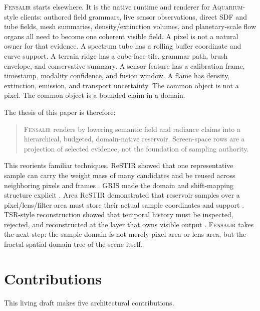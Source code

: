 \documentclass[11pt]{article}
\newcommand{\Fensalir}{\textsc{Fensalir}}
\newcommand{\Aquarium}{\textsc{Aquarium}}
\newcommand{\ReSTIR}{ReSTIR}
\newcommand{\AreaReSTIR}{Area ReSTIR}
\newcommand{\TSR}{TSR}
\newcommand{\GRIS}{GRIS}
\begin{document}
\Fensalir{} starts elsewhere.  It is the native runtime and renderer for
\Aquarium-style clients: authored field grammars, live sensor observations,
direct SDF and tube fields, mesh summaries, density/extinction volumes, and
planetary-scale flow organs all need to become one coherent visible field.  A
pixel is not a natural owner for that evidence.  A spectrum tube has a rolling
buffer coordinate and curve support.  A terrain ridge has a cube-face tile,
grammar path, brush envelope, and conservative summary.  A sensor feature has a
calibration frame, timestamp, modality confidence, and fusion window.  A flame
has density, extinction, emission, and transport uncertainty.  The common
object is not a pixel.  The common object is a bounded claim in a domain.

The thesis of this paper is therefore:

\begin{quote}
\Fensalir{} renders by lowering semantic field and radiance claims into a
hierarchical, budgeted, domain-native reservoir.  Screen-space rows are a
projection of selected evidence, not the foundation of sampling authority.
\end{quote}

This reorients familiar techniques.  \ReSTIR{} showed that one representative
sample can carry the weight mass of many candidates and be reused across
neighboring pixels and frames \cite{bitterli2020restir,ouyang2021restirgi}.
\GRIS{} made the domain and shift-mapping structure explicit
\cite{lin2022gris}.  \AreaReSTIR{} demonstrated that reservoir samples over a
pixel/lens/filter area must store their actual sample coordinates and support
\cite{zhang2024arearestir,areaRestirCode}.  \TSR{}-style reconstruction showed
that temporal history must be inspected, rejected, and reconstructed at the
layer that owns visible output \cite{unrealTSR,unrealTSRFAQ}.  \Fensalir{}
takes the next step: the sample domain is not merely pixel area or lens area,
but the fractal spatial domain tree of the scene itself.

\section{Contributions}

This living draft makes five architectural contributions.
\end{document}
